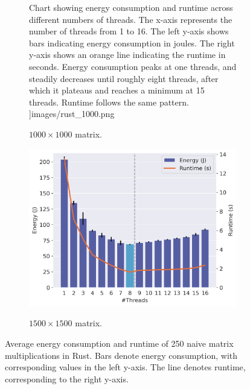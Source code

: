 \begin{figure}[!ht]
\begin{subfigure}{0.33\linewidth}
{            Chart showing energy consumption and runtime across different numbers of threads. The
            x-axis represents the number of threads from 1 to 16. The left y-axis shows bars
            indicating energy consumption in joules. The right y-axis shows an orange line
            indicating the runtime in seconds. Energy consumption peaks at one threads, and steadily
            decreases until roughly eight threads, after which it plateaus and reaches a minimum at
            15 threads. Runtime follows the same pattern.
        }]{images/rust_1000.png}
        \caption{$1000 \times 1000$ matrix.}
        \label{fig:rust2}
    \end{subfigure}%
    \begin{subfigure}{0.33\linewidth}
        \includegraphics[width=\linewidth,alt={
            Chart showing energy consumption and runtime across different numbers of threads. The
            x-axis represents the number of threads from 1 to 16. The left y-axis shows bars
            indicating energy consumption in joules. The right y-axis shows an orange line
            indicating the runtime in seconds. Energy consumption peaks at one threads, and steadily
            decreases until it reaches a minimum at eight threads, after which energy consumption
            starts gradually increasing again. Runtime follows the same pattern.
        }]{images/rust_1500.png}
        \caption{$1500 \times 1500$ matrix.}
        \label{fig:rust3}
    \end{subfigure}%
    \caption{Average energy consumption and runtime of 250 naive matrix multiplications in Rust.
    Bars denote energy consumption, with corresponding values in the left y-axis.
    The line denotes runtime, corresponding to the right y-axis.}
    \label{fig:rust}
\end{figure}

